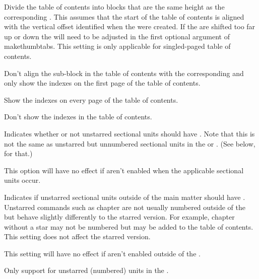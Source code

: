\documentclass[fontsize=12pt]{scrbook}
\begin{document}

Divide the table of contents into blocks that are the
same height as the corresponding .
This assumes that the start of the table of contents
is aligned with the vertical offset identified when the
 were created. If the  are shifted
too far up or down the  will need to be adjusted
in the first optional argument of \gls{makethumbtabs}.
This setting is only applicable for singled-paged table of contents.


Don't align the sub-block in the table of contents with the corresponding
 and only show the  indexes on the first
page of the table of contents.


Show the  indexes on every page of the table of
contents.


Don't show the  indexes in the table of
contents.


Indicates whether or not unstarred sectional units should have
. Note that this is not the same as unstarred but
unnumbered sectional units in the  or
. (See  below, for that.)

This option will have no effect if  aren't enabled
when the applicable sectional units occur.


Indicates if unstarred sectional units outside of the main matter
should have . Unstarred commands such as
\gls{chapter} are not usually numbered outside of the
 but behave slightly differently to the starred
version. For example, \gls{chapter} without a star may not be
numbered but may be added to the table of contents.
This setting does not affect the starred version.

This setting will have no effect if  aren't enabled
outside of the .


Only support  for unstarred (numbered) units in the 
.
\end{document}
